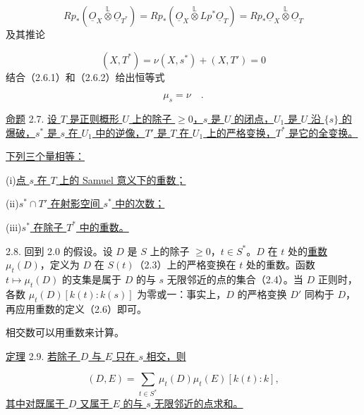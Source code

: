 \begin{equation*}
Rp_*(\underline{O}_X\overset{\mathbb L}{\otimes}\underline{O}_{T^*})
=Rp_*(\underline{O}_X\overset{\mathbb L}{\otimes}Lp^*\underline{O}_T)
=Rp_*\underline{O}_X\overset{\mathbb L}{\otimes}\underline{O}_T
\end{equation*}
及其推论

\begin{equation*}
(X,T^*)=\nu(X,s^*)+(X,T')=0
\end{equation*}
结合（2.6.1）和（2.6.2）给出恒等式

\begin{equation}\tag{2.6.3}
\mu_s=\nu \quad .
\end{equation}


\underline{命题} 2.7. \underline{设 $T$ 是正则概形 $U$ 上的除子 $\geq0$，$s$ 是 $U$ 的闭点，$U_1$ 是 $U$ 沿 $\{s\}$ 的爆破，$s^*$ 是 $s$ 在 $U_1$ 中的逆像，$T'$ 是 $T$ 在 $U_1$ 上的严格变换，$T^*$ 是它的全变换。}

\underline{下列三个量相等：}

(i)\quad \underline{点 $s$ 在 $T$ 上的 Samuel 意义下的重数；}

(ii)\quad \underline{$s^*\cap T'$ 在射影空间 $s^*$ 中的次数；}

(iii)\quad \underline{$s^*$ 在除子 $T^*$ 中的重数。}

2.8. 回到 2.0 的假设。设 $D$ 是 $S$ 上的除子 $\geq0$，$t\in S^*$。$D$ 在 $t$ 处的\underline{重数} $\mu_t(D)$，定义为 $D$ 在 $S(t)$（2.3）上的严格变换在 $t$ 处的重数。函数 $t\mapsto\mu_t(D)$ 的支集是属于 $D$ 的与 $s$ 无限邻近的点的集合（2.4）。当 $D$ 正则时，各数 $\mu_t(D)[k(t):k(s)]$ 为零或一：事实上，$D$ 的严格变换 $D'$ 同构于 $D$，再应用重数的定义（2.6）即可。

相交数可以用重数来计算。

\underline{定理} 2.9. \underline{若除子 $D$ 与 $E$ 只在 $s$ 相交，则}

\begin{equation*}
(D,E)=\sum_{t\in S^*}\mu_t(D)\mu_t(E)[k(t):k],
\end{equation*}
\underline{其中对既属于 $D$ 又属于 $E$ 的与 $s$ 无限邻近的点求和。}